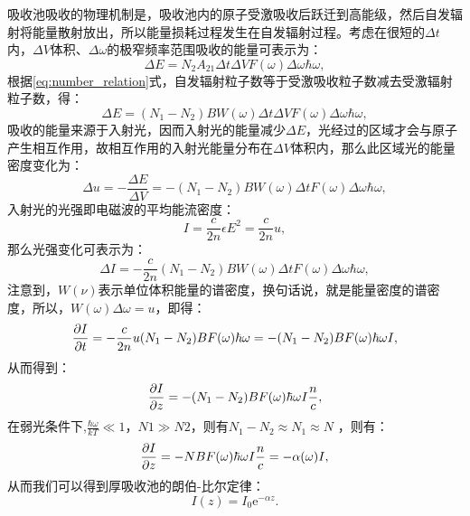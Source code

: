 \documentclass[12pt, a4paper, oneside]{ctexart}
\begin{document}
	吸收池吸收的物理机制是，吸收池内的原子受激吸收后跃迁到高能级，然后自发辐射将能量散射放出，所以能量损耗过程发生在自发辐射过程。考虑在很短的$\Delta t$内，$\Delta V$体积、$\Delta \omega$的极窄频率范围吸收的能量可表示为：
	\begin{equation}
		\Delta E = N_2 A_{21} \Delta t \Delta V F(\omega) \Delta \omega \hbar \omega,
	\end{equation}
	根据\eqref{eq:number_relation}式，自发辐射粒子数等于受激吸收粒子数减去受激辐射粒子数，得：
	\begin{equation}
		\Delta E = (N_1 - N_2) B W(\omega) \Delta t \Delta V F(\omega) \Delta \omega \hbar \omega,
	\end{equation}
	吸收的能量来源于入射光，因而入射光的能量减少$\Delta E$，光经过的区域才会与原子产生相互作用，故相互作用的入射光能量分布在$\Delta V$体积内，那么此区域光的能量密度变化为：
	\begin{equation*}
		\Delta u = -\frac{\Delta E}{\Delta V} = -(N_1 - N_2) B W(\omega) \Delta t F(\omega) \Delta \omega \hbar \omega,
	\end{equation*}
	入射光的光强即电磁波的平均能流密度：
	\begin{equation}
		I = \frac{c}{2n} \epsilon E^2  = \frac{c}{2n} u,
	\end{equation}
	那么光强变化可表示为：
	\begin{equation}
		\Delta I = -\frac{c}{2n}  (N_1 - N_2) B W(\omega) \Delta t F(\omega) \Delta \omega \hbar \omega,
	\end{equation}
	注意到，$W(\nu)$表示单位体积能量的谱密度，换句话说，就是能量密度的谱密度，所以，$W(\omega)\Delta \omega = u$，即得：
	\begin{equation}
		\pdv{I}{t} = -\frac{c}{2n} u  (N_1 - N_2)  B F(\omega) \hbar \omega = -(N_1 - N_2)  B F(\omega) \hbar \omega I,
	\end{equation}
	从而得到：
	\begin{equation}
		\pdv{I}{z}  = -(N_1 - N_2)  B F(\omega) \hbar \omega I \frac{n}{c}
		\label{eq:dI/dt},
	\end{equation}
	在弱光条件下,$\frac{\hbar \omega}{kT} \ll 1$，$N1 \gg N2$，则有$N_1 - N_2 \approx N_1 \approx N$
	，则有：
	\begin{equation}
		\pdv{I}{z}  = -N  B F(\omega) \hbar \omega I \frac{n}{c} = -\alpha(\omega) I,
	\end{equation}
	从而我们可以得到厚吸收池的朗伯-比尔定律：
	\begin{equation}
		I(z) = I_0 \mathrm{e}^{-\alpha z}.
	\end{equation}
\end{document}
